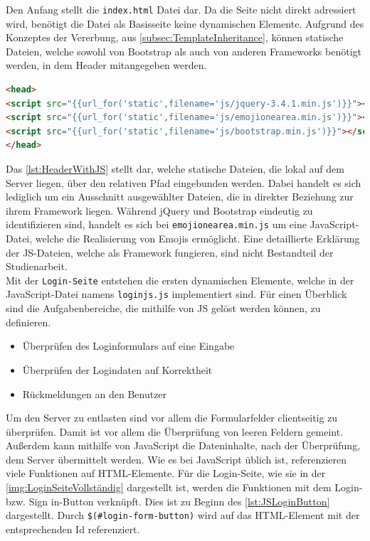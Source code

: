 \documentclass[a4paper,titlepage,halfparskip,12pt]{scrreprt}
\begin{document}
\begin{onehalfspacing}
Den Anfang stellt die \texttt{index.html} Datei dar. Da die Seite nicht direkt adressiert wird, benötigt die Datei als Basisseite keine dynamischen Elemente. Aufgrund des Konzeptes der Vererbung, aus \autoref{subsec:TemplateInheritance}, können statische Dateien, welche sowohl von Bootstrap als auch von anderen Frameworks benötigt werden, in dem Header mitangegeben werden. 
\begin{lstlisting}[language=HTML,caption=Listing der eingebundenen JS-Dateien im Header der index.html,label={lst:HeaderWithJS}]
<head>
<script src="{{url_for('static',filename='js/jquery-3.4.1.min.js')}}"></script>
<script src="{{url_for('static',filename='js/emojionearea.min.js')}}"></script>
<script src="{{url_for('static',filename='js/bootstrap.min.js')}}"></script>
</head>
\end{lstlisting}
Das \autoref{lst:HeaderWithJS} stellt dar, welche statische Dateien, die lokal auf dem Server liegen, über den relativen Pfad eingebunden werden. Dabei handelt es sich lediglich um ein Ausschnitt ausgewählter Dateien, die in direkter Beziehung zur ihrem Framework liegen. Während jQuery und Bootstrap eindeutig zu identifizieren sind, handelt es sich bei \texttt{emojionearea.min.js} um eine JavaScript-Datei, welche die Realisierung von Emojis ermöglicht. Eine detaillierte Erklärung der \ac{JS}-Dateien, welche als Framework fungieren, sind nicht Bestandteil der Studienarbeit.\\
Mit der \texttt{Login-Seite} entstehen die ersten dynamischen Elemente, welche in der JavaScript-Datei namens \texttt{loginjs.js} implementiert sind. Für einen Überblick sind die Aufgabenbereiche, die mithilfe von \ac{JS} gelöst werden können, zu definieren.
\begin{itemize}
	\item Überprüfen des Loginformulars auf eine Eingabe
	\item Überprüfen der Logindaten auf Korrektheit
	\item Rückmeldungen an den Benutzer
\end{itemize}
Um den Server zu entlasten sind vor allem die Formularfelder clientseitig zu überprüfen. Damit ist vor allem die Überprüfung von leeren Feldern gemeint. Außerdem kann mithilfe von JavaScript die Dateninhalte, nach der Überprüfung, dem Server übermittelt werden. Wie es bei JavaScript üblich ist, referenzieren viele Funktionen auf \ac{HTML}-Elemente. Für die Login-Seite, wie sie in der \autoref{img:LoginSeiteVollständig} dargestellt ist, werden die Funktionen mit dem Login- bzw. Sign in-Button verknüpft. Dies ist zu Beginn des \autoref{lst:JSLoginButton} dargestellt. Durch \texttt{\$(\#login-form-button)} wird auf das \ac{HTML}-Element mit der entsprechenden Id referenziert. 

\end{onehalfspacing}
\end{document}
